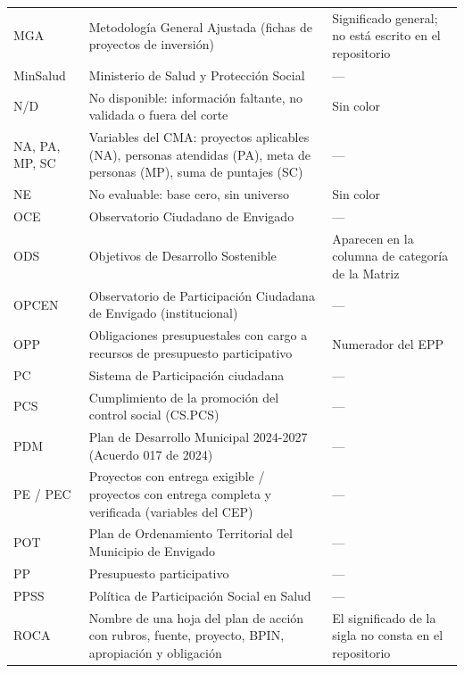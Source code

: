 \documentclass[11pt,letterpaper]{article}
\begin{document}
{\begin{xltabular}{\linewidth}{L{2.56cm}L{8.91cm}L{4.46cm}}
MGA & Metodología General Ajustada (fichas de proyectos de inversión) & Significado general; no está escrito en el repositorio \\
MinSalud & Ministerio de Salud y Protección Social & --- \\
N/D & No disponible: información faltante, no validada o fuera del corte & Sin color \\
NA, PA, MP, SC & Variables del CMA: proyectos aplicables (NA), personas atendidas (PA), meta de personas (MP), suma de puntajes (SC) & --- \\
NE & No evaluable: base cero, sin universo & Sin color \\
OCE & Observatorio Ciudadano de Envigado & --- \\
ODS & Objetivos de Desarrollo Sostenible & Aparecen en la columna de categoría de la Matriz \\
OPCEN & Observatorio de Participación Ciudadana de Envigado (institucional) & --- \\
OPP & Obligaciones presupuestales con cargo a recursos de presupuesto participativo & Numerador del EPP \\
PC & Sistema de Participación ciudadana & --- \\
PCS & Cumplimiento de la promoción del control social (CS.PCS) & --- \\
PDM & Plan de Desarrollo Municipal 2024-2027 (Acuerdo 017 de 2024) & --- \\
PE / PEC & Proyectos con entrega exigible / proyectos con entrega completa y verificada (variables del CEP) & --- \\
POT & Plan de Ordenamiento Territorial del Municipio de Envigado & --- \\
PP & Presupuesto participativo & --- \\
PPSS & Política de Participación Social en Salud & --- \\
ROCA & Nombre de una hoja del plan de acción con rubros, fuente, proyecto, BPIN, apropiación y obligación & El significado de la sigla no consta en el repositorio \\

\end{xltabular}}
\end{document}

